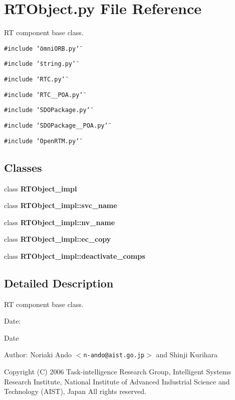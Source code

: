 \section{RTObject.py File Reference}
\label{RTObject_8py}
RT component base class. 

{\tt \#include \char`\"{}omni\-ORB.py\char`\"{}}\par
{\tt \#include \char`\"{}string.py\char`\"{}}\par
{\tt \#include \char`\"{}RTC.py\char`\"{}}\par
{\tt \#include \char`\"{}RTC\_\-\_\-POA.py\char`\"{}}\par
{\tt \#include \char`\"{}SDOPackage.py\char`\"{}}\par
{\tt \#include \char`\"{}SDOPackage\_\-\_\-POA.py\char`\"{}}\par
{\tt \#include \char`\"{}Open\-RTM.py\char`\"{}}\par
\subsection*{Classes}
\begin{CompactItemize}
\item 
class {\bf RTObject\_\-impl}
\item 
class {\bf RTObject\_\-impl::svc\_\-name}
\item 
class {\bf RTObject\_\-impl::nv\_\-name}
\item 
class {\bf RTObject\_\-impl::ec\_\-copy}
\item 
class {\bf RTObject\_\-impl::deactivate\_\-comps}
\end{CompactItemize}


\subsection{Detailed Description}
RT component base class. 

\begin{Desc}
\item[Date:]\begin{Desc}
\item[Date]\end{Desc}
\end{Desc}
\begin{Desc}
\item[Author:]Noriaki Ando $<${\tt n-ando@aist.go.jp}$>$ and Shinji Kurihara\end{Desc}
Copyright (C) 2006 Task-intelligence Research Group, Intelligent Systems Research Institute, National Institute of Advanced Industrial Science and Technology (AIST), Japan All rights reserved.